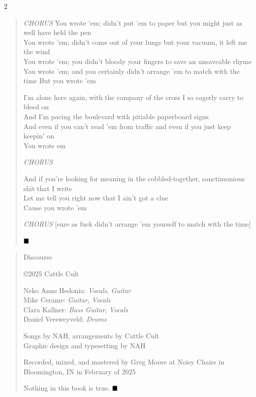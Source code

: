 \documentclass[11pt]{book}
\begin{document}
\begin{multicols}{2}
\begin{verse}
\hspace{2em} \emph{CHORUS}
\hspace{2em} You wrote 'em; didn't put 'em to paper but you might just as well have held the pen \\
\hspace{2em} You wrote 'em; didn't come out of your lungs but your vacuum, it left me the wind \\
\hspace{2em} You wrote 'em; you didn't bloody your fingers to save an unsaveable rhyme \\
\hspace{2em} You wrote 'em; and you certainly didn't arrange 'em to match with the time
\hspace{2em} But you wrote 'em

I'm alone here again, with the company of the cross I so eagerly carry to bleed on \\
And I'm pacing the boulevard with pitiable paperboard signs \\
And even if you can't read 'em from traffic and even if you just keep keepin' on \\
You wrote em

\hspace{2em} \emph{CHORUS}

And if you're looking for meaning in the cobbled-together, sanctimonious shit that I write \\
Let me tell you right now that I ain't got a clue \\
Cause you wrote 'em

\hspace{2em} \emph{CHORUS} [sure as fuck didn't arrange 'em yourself to match with the time]

$\hfill\blacksquare$
\end{verse}
\end{multicols}

\pagebreak

\begin{verse}
\huge
Discourse

\small
\copyright 2025 Cattle Cult

Neko Anne Hedonia: \emph{Vocals}, \emph{Guitar} \\
Mike Cerame: \emph{Guitar}, \emph{Vocals} \\
Clara Kallner: \emph{Bass Guitar}, \emph{Vocals} \\
Daniel Versweyveld: \emph{Drums}

Songs by NAH, arrangements by Cattle Cult \\
Graphic design and typesetting by NAH

Recorded, mixed, and mastered by Greg Moore at Noisy Chairs in Bloomington, IN in February of 2025

Nothing in this book is true.
$\hfill\blacksquare$
\end{verse}
\end{document}
